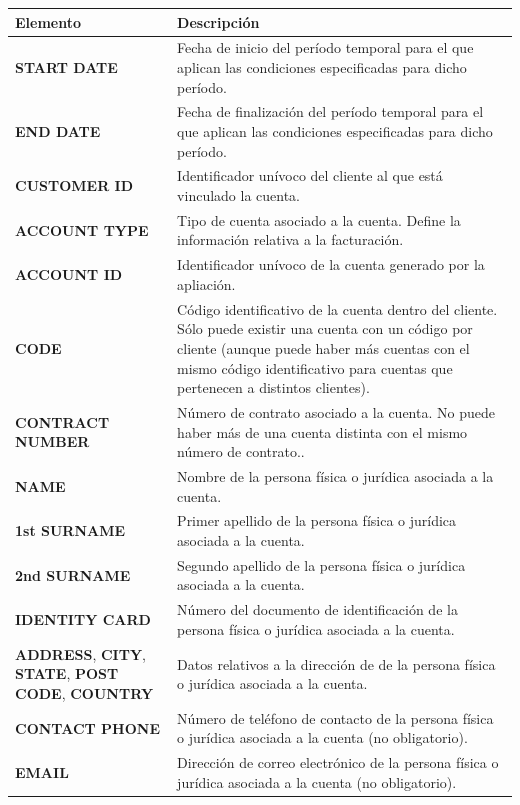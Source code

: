 \begin{table}[H]
  \centering
  \setlength{\leftmargini}{0.4cm}
  \resizebox{14cm}{!} {
  \begin{tabular}{|m{6cm} m{8cm}|}
  \rowcolor{udcpink!25}
  \hline
  	\textbf{Elemento} & \textbf{Descripción} \\\hline
  	\textbf{START DATE} & Fecha de inicio del período temporal para el que aplican las condiciones especificadas para dicho período.\\
  	\textbf{END DATE} & Fecha de finalización del período temporal para el que aplican las condiciones especificadas para dicho período.\\
	\textbf{CUSTOMER ID} & Identificador unívoco del cliente al que está vinculado la cuenta.\\
	\textbf{ACCOUNT TYPE} & Tipo de cuenta asociado a la cuenta. Define la información relativa a la facturación.\\
	\textbf{ACCOUNT ID} & Identificador unívoco de la cuenta generado por la apliación.\\
	\textbf{CODE} & Código identificativo de la cuenta dentro del cliente. Sólo puede existir una cuenta con un código por cliente (aunque puede haber más cuentas con el mismo código identificativo para cuentas que pertenecen a distintos clientes).\\
	\textbf{CONTRACT NUMBER} & Número de contrato asociado a la cuenta. No puede haber más de una cuenta distinta con el mismo número de contrato..\\
	\textbf{NAME} & Nombre de la persona física o jurídica asociada a la cuenta.\\
	\textbf{1st SURNAME} & Primer apellido de la persona física o jurídica asociada a la cuenta.\\
	\textbf{2nd SURNAME} & Segundo apellido de la persona física o jurídica asociada a la cuenta.\\
	\textbf{IDENTITY CARD} & Número del documento de identificación de la persona física o jurídica asociada a la cuenta.\\	
	\textbf{ADDRESS}, \textbf{CITY}, \textbf{STATE}, \textbf{POST CODE}, \textbf{COUNTRY}  & Datos relativos a la dirección de de la persona física o jurídica asociada a la cuenta.\\	
	\textbf{CONTACT PHONE} & Número de teléfono de contacto de la persona física o jurídica asociada a la cuenta (no obligatorio).\\
	\textbf{EMAIL} & Dirección de correo electrónico de la persona física o jurídica asociada a la cuenta (no obligatorio).\\

\end{tabular}}
\end{table}
